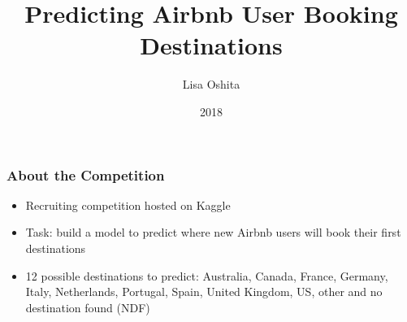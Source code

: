 \documentclass{beamer}
\title{Predicting Airbnb User Booking Destinations}
\author{Lisa Oshita}
\institute{California Polytechnic State University, San Luis Obispo}
\date{2018}
\begin{document}
 
\frame{\titlepage}

\begin{frame}
\frametitle{About the Competition}
  \begin{itemize}
    \item Recruiting competition hosted on Kaggle
    \item Task: build a model to predict where new Airbnb users will book their first destinations
    \item 12 possible destinations to predict: Australia, Canada, France, Germany, Italy, Netherlands, Portugal, Spain, United Kingdom, US, other and no destination found (NDF)
  \end{itemize}
\end{frame}




% 
%   
%   
% 
%   
\end{document}
